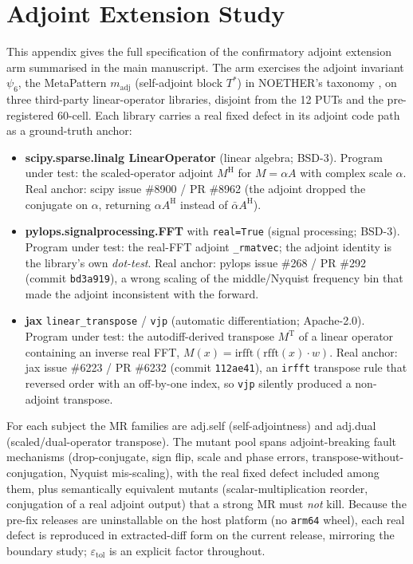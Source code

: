 \documentclass[manuscript,screen,review]{acmart}
\begin{document}
\section{Adjoint Extension Study}\label{h.-adjoint-extension-arm}

This appendix gives the full specification of the confirmatory adjoint
extension arm summarised in the main manuscript. The arm
exercises the adjoint invariant $\psi_6$, the MetaPattern
$m_{\mathrm{adj}}$ (self-adjoint block $T^{*}$) in NOETHER's taxonomy
\citep{noether2026}, on three third-party
linear-operator libraries, disjoint from the 12 PUTs and the
pre-registered 60-cell. Each library carries a real fixed defect in its
adjoint code path as a ground-truth anchor:

\begin{itemize}

\item
  \textbf{scipy.sparse.linalg LinearOperator} (linear algebra; BSD-3).
  Program under test: the scaled-operator adjoint $M^{\mathrm{H}}$ for
  $M = \alpha A$ with complex scale $\alpha$. Real anchor: scipy issue
  \#8900 / PR \#8962 (the adjoint dropped the conjugate on $\alpha$,
  returning $\alpha A^{\mathrm{H}}$ instead of $\bar{\alpha}
  A^{\mathrm{H}}$).
\item
  \textbf{pylops.signalprocessing.FFT} with \texttt{real=True} (signal
  processing; BSD-3). Program under test: the real-FFT adjoint
  \texttt{\_rmatvec}; the adjoint identity is the library's own
  \emph{dot-test}. Real anchor: pylops issue \#268 / PR \#292 (commit
  \texttt{bd3a919}), a wrong scaling of the middle/Nyquist frequency bin
  that made the adjoint inconsistent with the forward.
\item
  \textbf{jax} \texttt{linear\_transpose} / \texttt{vjp} (automatic
  differentiation; Apache-2.0). Program under test: the autodiff-derived
  transpose $M^{\mathrm{T}}$ of a linear operator containing an inverse
  real FFT, $M(x) = \mathrm{irfft}(\mathrm{rfft}(x)\cdot w)$. Real anchor:
  jax issue \#6223 / PR \#6232 (commit \texttt{112ae41}), an
  \texttt{irfft} transpose rule that reversed order with an off-by-one
  index, so \texttt{vjp} silently produced a non-adjoint transpose.
\end{itemize}

For each subject the MR families are adj.self (self-adjointness) and
adj.dual (scaled/dual-operator transpose). The mutant pool spans
adjoint-breaking fault mechanisms (drop-conjugate, sign flip, scale and
phase errors, transpose-without-conjugation, Nyquist mis-scaling), with
the real fixed defect included among them, plus semantically equivalent
mutants (scalar-multiplication reorder, conjugation of a real adjoint
output) that a strong MR must \emph{not} kill. Because the pre-fix
releases are uninstallable on the host platform (no \texttt{arm64} wheel),
each real defect is reproduced in extracted-diff form on the current
release, mirroring the boundary study; $\varepsilon_{\mathrm{tol}}$ is an
explicit factor throughout.
\end{document}
